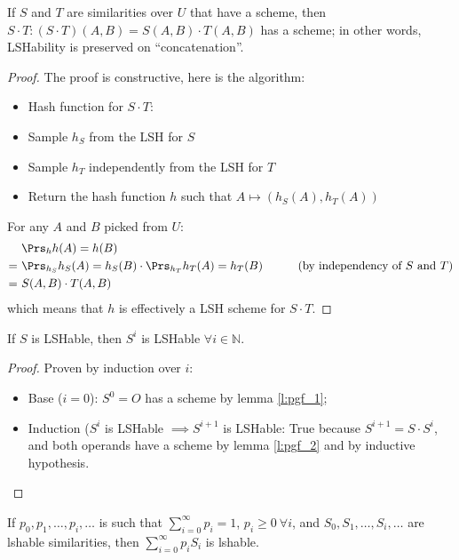\begin{lem}[L2]\label{l:pgf_2}
	If $S$ and $T$ are similarities over $U$ that have a scheme, then $S \cdot T : (S \cdot T)(A, B) = S(A, B) \cdot T(A, B)$ has a scheme; in other words, LSHability is preserved on ``concatenation''.
\end{lem}

\begin{proof}
	The proof is constructive, here is the algorithm:
	\begin{itemize}
		\item[] Hash function for $S \cdot T$:
		\item Sample $h_S$ from the LSH for $S$
		\item Sample $h_T$ independently from the LSH for $T$
		\item Return the hash function $h$ such that $A \mapsto (h_S(A), h_T(A))$
	\end{itemize}

	For any $A$ and $B$ picked from $U$:
	\begin{align*}
		&\  \Prs_h{h(A) = h(B)} 										  & \\
		=&\ \Prs_{h_S}{h_S(A) = h_S(B)} \cdot \Prs_{h_T}{h_T(A) = h_T(B)} & \tag{by independency of $S$ and $T$} \\
		=&\ S(A, B) \cdot T(A, B)										  &
	\end{align*}
	which means that $h$ is effectively a LSH scheme for $S \cdot T$.
\end{proof}

\begin{lem}[L3]\label{l:pgf_3}
	If $S$ is LSHable, then $S^i$ is LSHable $\forall i \in \mathbb{N}$.
\end{lem}

\begin{proof}
	Proven by induction over $i$:
	\begin{itemize}
		\item Base ($i = 0$): $S^0 = O$ has a scheme by lemma \ref{l:pgf_1};
		\item Induction ($S^i$ is LSHable $\implies S^{i+1}$ is LSHable: True because $S^{i + 1} = S \cdot S^i$, and both operands have a scheme by lemma \ref{l:pgf_2} and by inductive hypothesis.
	\end{itemize}
\end{proof}

\begin{lem}[L4]\label{l:pgf_4}
	If $p_0, p_1, \dots, p_i, \dots$ is such that $\sum_{i = 0}^{\infty} p_i = 1$, $p_i \geq 0 \ \forall i$, and $S_0, S_1, \dots, S_i, \dots$ are lshable similarities, then $\sum_{i = 0}^{\infty} p_i S_i$ is lshable.
\end{lem}

